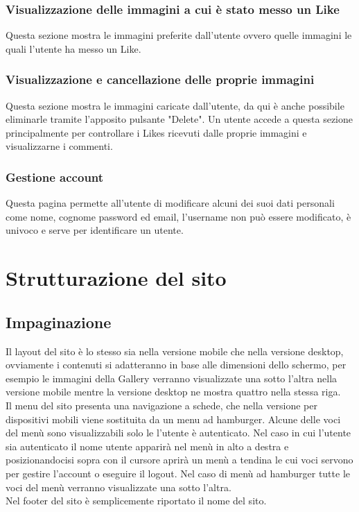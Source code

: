 \documentclass[openany, a4paper, 12pt]{report}
\begin{document}
		\subsubsection{Visualizzazione delle immagini a cui è stato messo un Like}
		Questa sezione mostra le immagini preferite dall'utente ovvero quelle immagini le quali l'utente ha messo un Like.
		
		\subsubsection{Visualizzazione e cancellazione delle proprie immagini}
		Questa sezione mostra le immagini caricate dall'utente, da qui è anche possibile eliminarle tramite l'apposito pulsante "Delete". Un utente accede a questa sezione principalmente per controllare i Likes ricevuti dalle proprie immagini e visualizzarne i commenti.
		
		\subsubsection{Gestione account}
		Questa pagina permette all'utente di modificare alcuni dei suoi dati personali come nome, cognome password ed email, l'username non può essere modificato, è univoco e serve per identificare un utente.

	\section{Strutturazione del sito}
		\subsection{Impaginazione}
		Il layout del sito è lo stesso sia nella versione mobile che nella versione desktop, ovviamente i contenuti si adatteranno in base alle dimensioni dello schermo, per esempio le immagini della Gallery verranno visualizzate una sotto l'altra nella versione mobile mentre la versione desktop ne mostra quattro nella stessa riga.\\
		Il menu del sito presenta una navigazione a schede, che nella versione per dispositivi mobili viene sostituita da un menu ad hamburger. Alcune delle voci del menù sono visualizzabili solo le l'utente è autenticato. Nel caso in cui l'utente sia autenticato il nome utente apparirà nel menù in alto a destra e posizionandocisi sopra con il cursore aprirà un menù a tendina le cui voci servono per gestire l'account o eseguire il logout. Nel caso di menù ad hamburger tutte le voci del menù verranno visualizzate una sotto l'altra.\\
		Nel footer del sito è semplicemente riportato il nome del sito.
\end{document}
